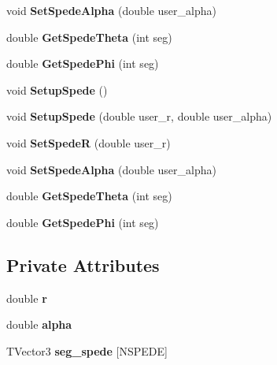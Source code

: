 \begin{DoxyCompactItemize}
void {\bfseries Set\+Spede\+Alpha} (double user\+\_\+alpha)
\item 
\mbox{\label{class_spede_geometry_a05865b0752fb518337a9a16f8fba9085}} 
double {\bfseries Get\+Spede\+Theta} (int seg)
\item 
\mbox{\label{class_spede_geometry_a93bd92636bce1259b189bb17275d238d}} 
double {\bfseries Get\+Spede\+Phi} (int seg)
\item 
\mbox{\label{class_spede_geometry_aff2cf68512c9a78eb117ff1ea44e95f0}} 
void {\bfseries Setup\+Spede} ()
\item 
\mbox{\label{class_spede_geometry_ae79185d5c0e1d21a1a26ef824038ce9c}} 
void {\bfseries Setup\+Spede} (double user\+\_\+r, double user\+\_\+alpha)
\item 
\mbox{\label{class_spede_geometry_ad17f4485ee83860a40082d8c8af5237c}} 
void {\bfseries Set\+SpedeR} (double user\+\_\+r)
\item 
\mbox{\label{class_spede_geometry_a94c3f5b2dbf4490db7d72514c8abe340}} 
void {\bfseries Set\+Spede\+Alpha} (double user\+\_\+alpha)
\item 
\mbox{\label{class_spede_geometry_a05865b0752fb518337a9a16f8fba9085}} 
double {\bfseries Get\+Spede\+Theta} (int seg)
\item 
\mbox{\label{class_spede_geometry_a93bd92636bce1259b189bb17275d238d}} 
double {\bfseries Get\+Spede\+Phi} (int seg)
\end{DoxyCompactItemize}
\subsection*{Private Attributes}
\begin{DoxyCompactItemize}
\item 
\mbox{\label{class_spede_geometry_a261e76a6451ed852aa0f86339bf8892d}} 
double {\bfseries r}
\item 
\mbox{\label{class_spede_geometry_a51d125e6521bb8e15a61b33fe938548f}} 
double {\bfseries alpha}
\item 
\mbox{\label{class_spede_geometry_a0efbafe73c5400c3c5266f2f3cada61a}} 
T\+Vector3 {\bfseries seg\+\_\+spede} \mbox{[}N\+S\+P\+E\+DE\mbox{]}
\end{DoxyCompactItemize}



